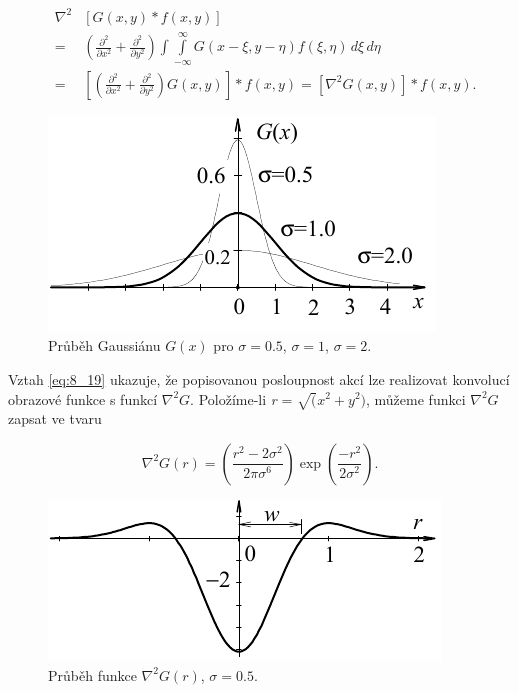 \begin{eqnarray} \label{eq:8_19}
    &\nabla^2& [G(x, y) \ast f(x, y) ] \\
    &=& \left( \frac{\partial^2}{\partial x^2} + \frac{\partial^2}{\partial y^2} \right) \int \int\limits_{-\infty}^{\infty} G(x - \xi, y - \eta) f(\xi, \eta)\,d\xi\,d\eta \nonumber \\
    &=& \left[ \left( \frac{\partial^2}{\partial x^2} + \frac{\partial^2}{\partial y^2} \right) G(x, y) \right] \ast f(x, y) = \left[ \nabla^2 G(x, y) \right] \ast f(x, y).\nonumber
\end{eqnarray}

\begin{figure}[th]
    \begin{center}
        \includegraphics[scale=0.9]{08_segmentace/images/img_8_8.pdf}
    \end{center}
    \caption{Průběh Gaussiánu $G(x)$ pro $\sigma = 0.5$, $\sigma = 1$, $\sigma = 2$.}
    \label{img:8_8}
\end{figure}

Vztah \eqref{eq:8_19} ukazuje, že popisovanou posloupnost akcí lze realizovat konvolucí obrazové funkce s funkcí $\nabla^2 G$. Položíme-li \textit{r} = $\surd(x^2 + y^2)$, můžeme funkci $\nabla^2 G$ zapsat ve tvaru

\begin{equation} \label{eq:8_20}
    \nabla^2 G(r) = \left( \frac{r^2 -2\sigma^2}{2\pi\sigma^6} \right) \exp \left( \frac{-r^2}{2\sigma^2} \right).
\end{equation}

\begin{figure}[th]
    \begin{center}
        \includegraphics[scale=0.9]{08_segmentace/images/img_8_9.pdf}
    \end{center}
    \caption{Průběh funkce $\nabla^2 G(r)$, $\sigma = 0.5$.}
    \label{img:8_9}
\end{figure}


